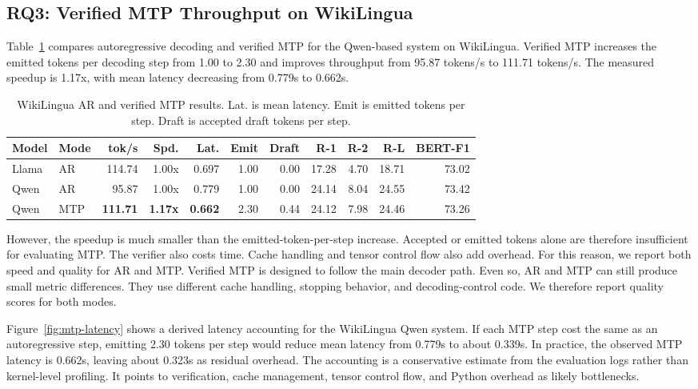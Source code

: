 \documentclass[11pt]{article}
\begin{document}
\subsection{RQ3: Verified MTP Throughput on WikiLingua}

Table~\ref{tab:mtp-results} compares autoregressive decoding and verified MTP for the Qwen-based system on WikiLingua.
Verified MTP increases the emitted tokens per decoding step from 1.00 to 2.30 and improves throughput from 95.87 tokens/s to 111.71 tokens/s.
The measured speedup is 1.17x, with mean latency decreasing from 0.779s to 0.662s.

\begin{table}[t]
\centering
\small
\begin{tabular}{llrrrrrrrrr}
\toprule
Model & Mode & tok/s & Spd. & Lat. & Emit & Draft & R-1 & R-2 & R-L & BERT-F1 \\
\midrule
Llama & AR & 114.74 & 1.00x & 0.697 & 1.00 & 0.00 & 17.28 & 4.70 & 18.71 & 73.02 \\
Qwen & AR & 95.87 & 1.00x & 0.779 & 1.00 & 0.00 & 24.14 & 8.04 & 24.55 & 73.42 \\
Qwen & MTP & \textbf{111.71} & \textbf{1.17x} & \textbf{0.662} & 2.30 & 0.44 & 24.12 & 7.98 & 24.46 & 73.26 \\
\bottomrule
\end{tabular}
\caption{WikiLingua AR and verified MTP results.
Lat. is mean latency.
Emit is emitted tokens per step.
Draft is accepted draft tokens per step.}
\label{tab:mtp-results}
\end{table}

However, the speedup is much smaller than the emitted-token-per-step increase.
Accepted or emitted tokens alone are therefore insufficient for evaluating MTP.
The verifier also costs time.
Cache handling and tensor control flow also add overhead.
For this reason, we report both speed and quality for AR and MTP.
Verified MTP is designed to follow the main decoder path.
Even so, AR and MTP can still produce small metric differences.
They use different cache handling, stopping behavior, and decoding-control code.
We therefore report quality scores for both modes.

Figure~\ref{fig:mtp-latency} shows a derived latency accounting for the WikiLingua Qwen system.
If each MTP step cost the same as an autoregressive step, emitting 2.30 tokens per step would reduce mean latency from 0.779s to about 0.339s.
In practice, the observed MTP latency is 0.662s, leaving about 0.323s as residual overhead.
The accounting is a conservative estimate from the evaluation logs rather than kernel-level profiling.
It points to verification, cache management, tensor control flow, and Python overhead as likely bottlenecks.
\end{document}
